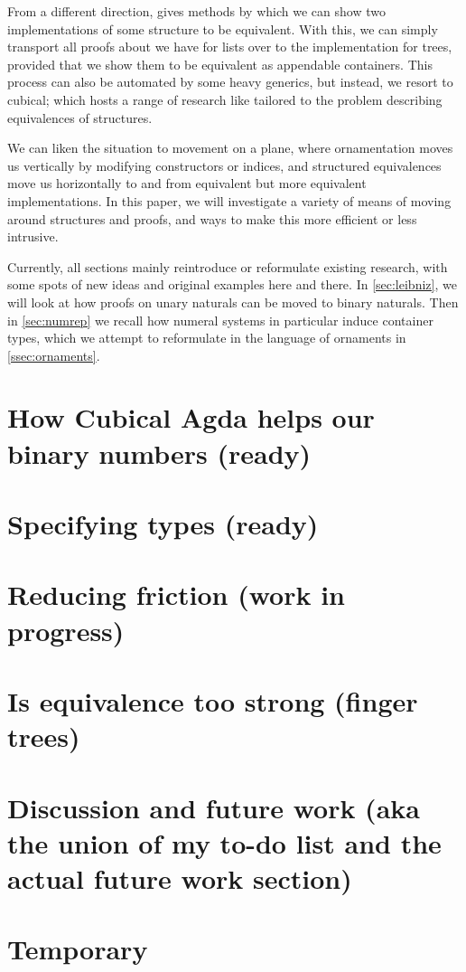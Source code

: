 \documentclass{article}
\theoremstyle{plain}%
\theoremstyle{definition}
\begin{document}
From a different direction, \cite{calcdata} gives methods by which we can show two implementations of some structure to be equivalent. With this, we can simply transport all proofs about \AgdaFunction{\_++\_} we have for lists over to the implementation for trees, provided that we show them to be equivalent as appendable containers. This process can also be automated by some heavy generics, but instead, we resort to cubical; which hosts a range of research like \cite{iri} tailored to the problem describing equivalences of structures.

We can liken the situation to movement on a plane, where ornamentation moves us vertically by modifying constructors or indices, and structured equivalences move us horizontally to and from equivalent but more equivalent implementations. In this paper, we will investigate a variety of means of moving around structures and proofs, and ways to make this more efficient or less intrusive.

Currently, all sections mainly reintroduce or reformulate existing research, with some spots of new ideas and original examples here and there. In \autoref{sec:leibniz}, we will look at how proofs on unary naturals can be moved to binary naturals. Then in \autoref{sec:numrep} we recall how numeral systems in particular induce container types, which we attempt to reformulate in the language of ornaments in \autoref{ssec:ornaments}.


\section{How Cubical Agda helps our binary numbers (ready)}\label{sec:leibniz}



\section{Specifying types (ready)}\label{sec:numrep}


\section{Reducing friction (work in progress)}\label{sec:userfriendly}


\section{Is equivalence too strong (finger trees)}\label{sec:weakening}



\section{Discussion and future work (aka the union of my to-do list and the actual future work section)}\label{sec:discussion}



\section{Temporary}\label{sec:temp}
\listoftodos
%


\printbibliography
\end{document}
